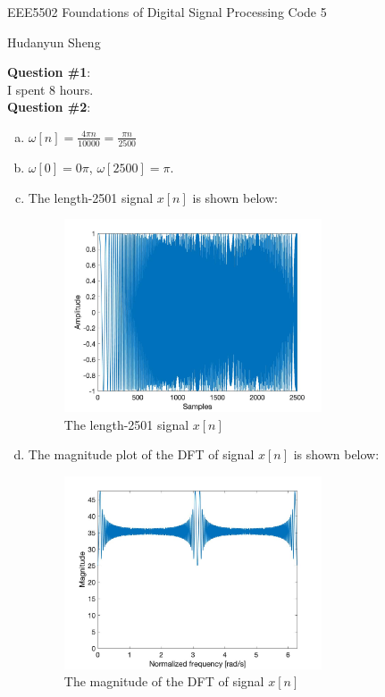 \documentclass[a4paper]{article}
\begin{document}
\begin{spacing}{2.0}
\begin{flushleft}\begin{huge}EEE5502 Foundations of Digital Signal Processing   Code 5\end{huge}\end{flushleft}
\begin{flushright}\begin{Large} Hudanyun Sheng \end{Large}\end{flushright}

\Large\textbf{ Question \#1}:  \\
\normalsize
I spent 8 hours.\\

\Large\textbf{Question \#2}:  
\normalsize
\begin{enumerate}[(a)]
\item $\omega[n] = \displaystyle\frac{4\pi n}{10000} =  \displaystyle\frac{\pi n}{2500} $

\item $\omega[0] = 0\pi$, $\omega[2500] = \pi$.

\item The length-2501 signal $x[n]$ is shown below:
\begin{figure} [H]
\centering
\includegraphics[width=3in]{Q2partc.jpg}
\caption{The length-2501 signal $x[n]$}
\label{fig:graph}
\end{figure}

\item The magnitude plot of the DFT of signal $x[n]$ is shown below:
\begin{figure}[H]
\centering
\includegraphics[width=3in]{Q2partd.jpg}
\caption{The magnitude of the DFT of signal $x[n]$}
\end{figure}


\end{enumerate}
\end{spacing}
\end{document}
